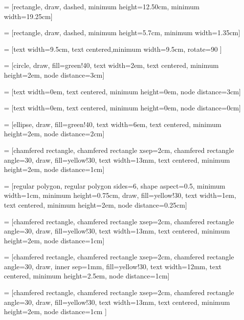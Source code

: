 \usepackage{amssymb}
\usepackage{tikz}
\usetikzlibrary{tikzmark}
\usetikzlibrary{shapes,arrows,arrows.meta,positioning}
\usetikzlibrary{shapes.multipart}

\newcommand{\MainlineShiftX}{0mm}
\newcommand{\AssignInFig}[2]{\makebox[5mm][l]{\ensuremath{#1}}\ensuremath{\gets#2}}

 = [rectangle, draw, dashed, minimum height=12.50cm, minimum width=19.25cm]

 = [rectangle, draw, dashed, minimum height=5.7cm, minimum width=1.35cm]

 = [text width=9.5cm, text centered,minimum width=9.5cm, rotate=90 ]

 = [circle, draw, fill=green!40, text width=2em, text centered, minimum height=2em, node distance=3cm]

 = [text width=0em, text centered, minimum height=0em, node distance=3cm]

 = [text width=0em, text centered, minimum height=0em, node distance=0cm]

 = [ellipse, draw, fill=green!40, text width=6em, text centered, minimum height=2em, node distance=2cm]

 = [chamfered rectangle, chamfered rectangle xsep=2cm, chamfered rectangle angle=30, draw, fill=yellow!30, text width=13mm, text centered, minimum height=2em, node distance=1cm]

 = [regular polygon, regular polygon sides=6, shape aspect=0.5, minimum width=1cm, minimum height=0.75cm, draw, fill=yellow!30, text width=1em, text centered, minimum height=2em, node distance=0.25cm]

 = [chamfered rectangle, chamfered rectangle xsep=2cm, chamfered rectangle angle=30, draw, fill=yellow!30, text width=13mm, text centered, minimum height=2em, node distance=1cm]

 = [chamfered rectangle, chamfered rectangle xsep=2cm, chamfered rectangle angle=30, draw, inner sep=1mm, fill=yellow!30, text width=12mm, text centered, minimum height=2.5em, node distance=1cm]

 = [chamfered rectangle, chamfered rectangle xsep=2cm, chamfered rectangle angle=30, draw, fill=yellow!30, text width=13mm, text centered, minimum height=2em, node distance=1cm ]

